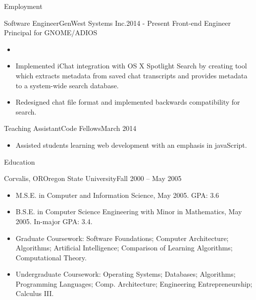 \documentclass[]{mcdowellcv}
\begin{document}
	\makeheader
	
	\begin{cvsection}{Employment}
		\begin{cvsubsection}{Software Engineer}{GenWest Systems Inc.}{2014 - Present}
			Front-end Engineer Principal for GNOME/ADIOS			
			\begin{itemize}
				\item 
				\item Implemented iChat integration with OS X Spotlight Search by creating tool which extracts metadata from saved chat transcripts and provides metadata to a system-wide search database.
				\item Redesigned chat file format and implemented backwards compatibility for search.
			\end{itemize}
		\end{cvsubsection}
		
		\begin{cvsubsection}{Teaching Assistant}{Code Fellows}{March 2014}	
			\begin{itemize}
				\item Assisted students learning web development with an emphasis in javaScript.
			\end{itemize}
		\end{cvsubsection}
	\end{cvsection}
	
	\begin{cvsection}{Education}
		\begin{cvsubsection}{Corvalis, OR}{Oregon State University}{Fall 2000 -- May 2005}
			\begin{itemize}
				\item M.S.E. in Computer and Information Science, May 2005. GPA: 3.6
				\item B.S.E. in Computer Science Engineering with Minor in Mathematics, May 2005.  In-major GPA: 3.4.
				\item Graduate Coursework: Software Foundations; Computer Architecture; Algorithms; Artificial Intelligence; Comparison of Learning Algorithms; Computational Theory.
				\item Undergraduate Coursework: Operating Systems; Databases; Algorithms; Programming Languages; Comp. Architecture; Engineering Entrepreneurship; Calculus III.
			\end{itemize}
		\end{cvsubsection}
	\end{cvsection}
	
\end{document}
